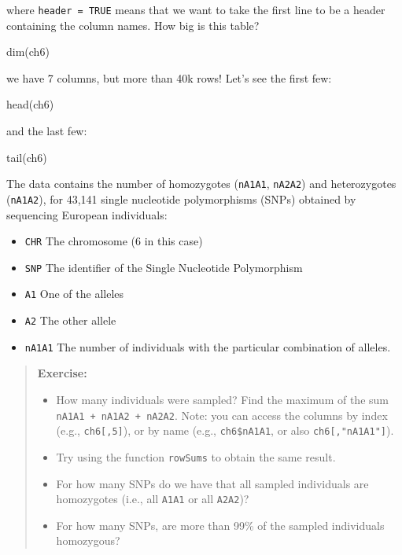 \documentclass[
  letterpaper,
  DIV=11,
  numbers=noendperiod]{scrreprt}
\newenvironment{Shaded}{\begin{snugshade}}{\end{snugshade}}
\newcommand{\NormalTok}[1]{\textcolor[rgb]{0.00,0.23,0.31}{#1}}
\providecommand{\tightlist}{%
  \setlength{\itemsep}{0pt}\setlength{\parskip}{0pt}}\usepackage{longtable,booktabs,array}
\begin{document}
where \texttt{header\ =\ TRUE} means that we want to take the first line
to be a header containing the column names. How big is this table?

\begin{Shaded}
\begin{Highlighting}[]
\NormalTok{dim(ch6)}
\end{Highlighting}
\end{Shaded}

we have 7 columns, but more than 40k rows! Let's see the first few:

\begin{Shaded}
\begin{Highlighting}[]
\NormalTok{head(ch6)}
\end{Highlighting}
\end{Shaded}

and the last few:

\begin{Shaded}
\begin{Highlighting}[]
\NormalTok{tail(ch6)}
\end{Highlighting}
\end{Shaded}

The data contains the number of homozygotes (\texttt{nA1A1},
\texttt{nA2A2}) and heterozygotes (\texttt{nA1A2}), for 43,141 single
nucleotide polymorphisms (SNPs) obtained by sequencing European
individuals:

\begin{itemize}
\tightlist
\item
  \texttt{CHR} The chromosome (6 in this case)
\item
  \texttt{SNP} The identifier of the Single Nucleotide Polymorphism
\item
  \texttt{A1} One of the alleles
\item
  \texttt{A2} The other allele
\item
  \texttt{nA1A1} The number of individuals with the particular
  combination of alleles.
\end{itemize}

\begin{quote}
\textbf{Exercise:}

\begin{itemize}
\tightlist
\item
  How many individuals were sampled? Find the maximum of the sum
  \texttt{nA1A1\ +\ nA1A2\ +\ nA2A2}. Note: you can access the columns
  by index (e.g., \texttt{ch6{[},5{]}}), or by name (e.g.,
  \texttt{ch6\$nA1A1}, or also \texttt{ch6{[},"nA1A1"{]}}).
\item
  Try using the function \texttt{rowSums} to obtain the same result.
\item
  For how many SNPs do we have that all sampled individuals are
  homozygotes (i.e., all \texttt{A1A1} or all \texttt{A2A2})?
\item
  For how many SNPs, are more than 99\% of the sampled individuals
  homozygous?
\end{itemize}
\end{quote}
\end{document}
